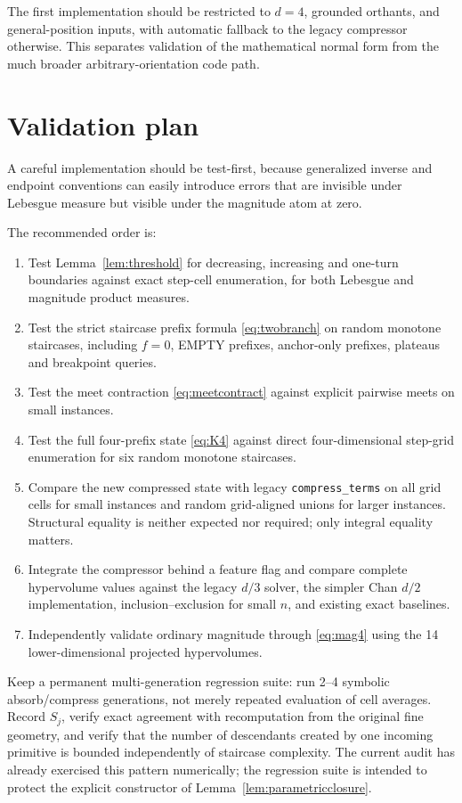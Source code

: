 \documentclass[12pt,a4paper]{article}
\theoremstyle{definition}
\newcommand{\1}{\mathbf 1}
\begin{document}
The first implementation should be restricted to $d=4$, grounded orthants, and general-position inputs, with automatic fallback to the legacy compressor otherwise. This separates validation of the mathematical normal form from the much broader arbitrary-orientation code path.

\section{Validation plan}

A careful implementation should be test-first, because generalized inverse and endpoint conventions can easily introduce errors that are invisible under Lebesgue measure but visible under the magnitude atom at zero.

The recommended order is:
\begin{enumerate}
\item Test Lemma~\ref{lem:threshold} for decreasing, increasing and one-turn boundaries against exact step-cell enumeration, for both Lebesgue and magnitude product measures.
\item Test the strict staircase prefix formula \eqref{eq:twobranch} on random monotone staircases, including $f=0$, EMPTY prefixes, anchor-only prefixes, plateaus and breakpoint queries.
\item Test the meet contraction \eqref{eq:meetcontract} against explicit pairwise meets on small instances.
\item Test the full four-prefix state \eqref{eq:K4} against direct four-dimensional step-grid enumeration for six random monotone staircases.
\item Compare the new compressed state with legacy \texttt{compress\_terms} on all grid cells for small instances and random grid-aligned unions for larger instances. Structural equality is neither expected nor required; only integral equality matters.
\item Integrate the compressor behind a feature flag and compare complete hypervolume values against the legacy $d/3$ solver, the simpler Chan $d/2$ implementation, inclusion--exclusion for small $n$, and existing exact baselines.
\item Independently validate ordinary magnitude through \eqref{eq:mag4} using the 14 lower-dimensional projected hypervolumes.
\end{enumerate}

Keep a permanent multi-generation regression suite: run 2--4 symbolic absorb/compress generations, not merely repeated evaluation of cell averages.  Record $S_j$, verify exact agreement with recomputation from the original fine geometry, and verify that the number of descendants created by one incoming primitive is bounded independently of staircase complexity.  The current audit has already exercised this pattern numerically; the regression suite is intended to protect the explicit constructor of Lemma~\ref{lem:parametricclosure}.
\end{document}

